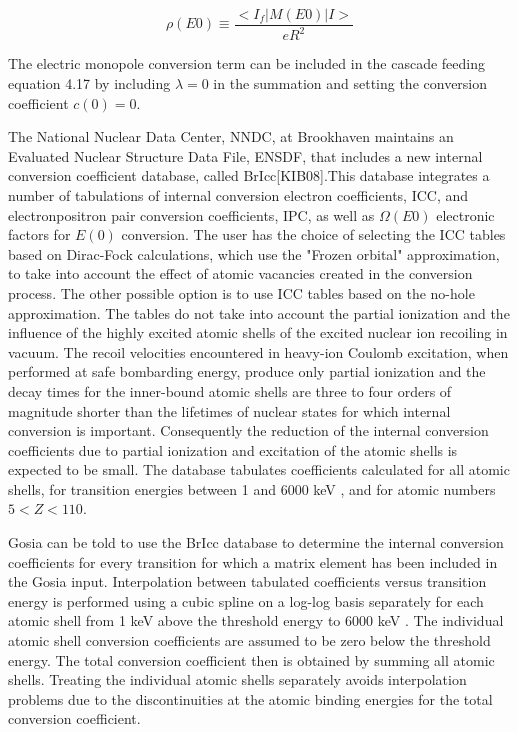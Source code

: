 \documentclass[10pt]{article}
\begin{document}
\begin{equation*}
\rho(E 0) \equiv \frac{<I_{f}|M(E 0)| I>}{e R^{2}} \tag{4.55}
\end{equation*}


The electric monopole conversion term can be included in the cascade feeding equation 4.17 by including $\lambda=0$ in the summation and setting the conversion coefficient $c(0)=0$.

The National Nuclear Data Center, NNDC, at Brookhaven maintains an Evaluated Nuclear Structure Data File, ENSDF, that includes a new internal conversion coefficient database, called BrIcc[KIB08].This database integrates a number of tabulations of internal conversion electron coefficients, ICC, and electronpositron pair conversion coefficients, IPC, as well as $\Omega(E 0)$ electronic factors for $E(0)$ conversion. The user has the choice of selecting the ICC tables based on Dirac-Fock calculations, which use the "Frozen orbital" approximation, to take into account the effect of atomic vacancies created in the conversion process. The other possible option is to use ICC tables based on the no-hole approximation. The tables do not take into account the partial ionization and the influence of the highly excited atomic shells of the excited nuclear ion recoiling in vacuum. The recoil velocities encountered in heavy-ion Coulomb excitation, when performed at safe bombarding energy, produce only partial ionization and the decay times for the inner-bound atomic shells are three to four orders of magnitude shorter than the lifetimes of nuclear states for which internal conversion is important. Consequently the reduction of the internal conversion coefficients due to partial ionization and excitation of the atomic shells is expected to be small. The database tabulates coefficients calculated for all atomic shells, for transition energies between 1 and 6000 keV , and for atomic numbers $5<Z<110$.

Gosia can be told to use the BrIcc database to determine the internal conversion coefficients for every transition for which a matrix element has been included in the Gosia input. Interpolation between tabulated coefficients versus transition energy is performed using a cubic spline on a log-log basis separately for each atomic shell from 1 keV above the threshold energy to 6000 keV . The individual atomic shell conversion coefficients are assumed to be zero below the threshold energy. The total conversion coefficient then is obtained by summing all atomic shells. Treating the individual atomic shells separately avoids interpolation problems due to the discontinuities at the atomic binding energies for the total conversion coefficient.
\end{document}

